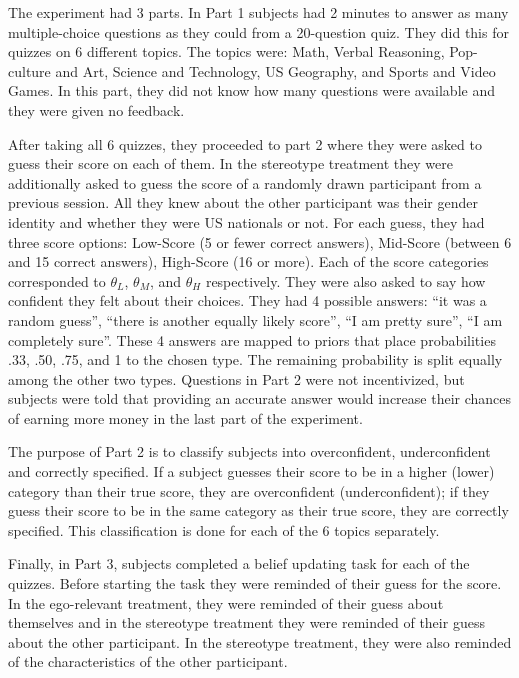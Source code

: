 \documentclass[
  12pt,
]{article}
\begin{document}
The experiment had 3 parts. In Part 1 subjects had 2 minutes to answer
as many multiple-choice questions as they could from a 20-question quiz.
They did this for quizzes on 6 different topics. The topics were: Math,
Verbal Reasoning, Pop-culture and Art, Science and Technology, US
Geography, and Sports and Video Games. In this part, they did not know
how many questions were available and they were given no feedback.

After taking all 6 quizzes, they proceeded to part 2 where they were
asked to guess their score on each of them. In the stereotype treatment
they were additionally asked to guess the score of a randomly drawn
participant from a previous session. All they knew about the other
participant was their gender identity and whether they were US nationals
or not. For each guess, they had three score options: Low-Score (5 or
fewer correct answers), Mid-Score (between 6 and 15 correct answers),
High-Score (16 or more). Each of the score categories corresponded to
\(\theta_L\), \(\theta_M\), and \(\theta_H\) respectively. They were
also asked to say how confident they felt about their choices. They had
4 possible answers: ``it was a random guess'', ``there is another
equally likely score'', ``I am pretty sure'', ``I am completely sure''.
These 4 answers are mapped to priors that place probabilities .33, .50,
.75, and 1 to the chosen type. The remaining probability is split
equally among the other two types. Questions in Part 2 were not
incentivized, but subjects were told that providing an accurate answer
would increase their chances of earning more money in the last part of
the experiment.

The purpose of Part 2 is to classify subjects into overconfident,
underconfident and correctly specified. If a subject guesses their score
to be in a higher (lower) category than their true score, they are
overconfident (underconfident); if they guess their score to be in the
same category as their true score, they are correctly specified. This
classification is done for each of the 6 topics separately.

Finally, in Part 3, subjects completed a belief updating task for each
of the quizzes. Before starting the task they were reminded of their
guess for the score. In the ego-relevant treatment, they were reminded
of their guess about themselves and in the stereotype treatment they
were reminded of their guess about the other participant. In the
stereotype treatment, they were also reminded of the characteristics of
the other participant.
\end{document}
